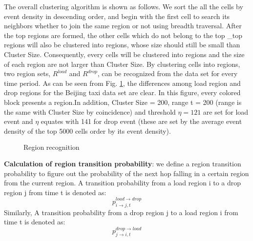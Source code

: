 The overall clustering algorithm is shown as follows. We sort the all the cells by event density in descending order, 
and begin with the first cell to search its neighbors whether to join the same region or not using breadth traversal. 
After the top regions are formed, the other cells which do not belong to the top \_top regions will also be clustered into regions, 
whose size should still be small than Cluster Size. Consequently, every cells will be clustered into regions and the size of each region are not larger than Cluster Size.
By clustering cells into regions, two region sets, \textbf{$R^{load}$} and \textbf{$R^{drop}$}, can be recognized from the data set for every time period. As can be seen from Fig. \ref{figure_region_recognizition}, the differences among load region and drop regions for the Beijing taxi data set are clear.
In this figure, every colored block presents a region.In addition, Cluster Size = 200, range t = 200 (range is the same with Cluster Size by coincidence) and threshold $\eta = 121$ are set for load event and $\eta$ equates with 141 for drop event (these are set by the average event density of the top 5000 cells order by its event density).
\begin{figure}[!t]
\centering
{}
\centering
\caption{Region recognition}\label{figure_region_recognizition}
\end{figure}

\textbf{Calculation of region transition probability}:
we define a region transition probability to figure out the probability of the next hop falling in a certain region from the current region.  A transition probability from a load region i to a drop region j from time t is denoted as:
\begin{equation}
p^{load\rightarrow drop}_{i\rightarrow j,t}
\end{equation}
Similarly, A transition probability from a drop region j to a load region i from time t is denoted as:
\begin{equation}
p^{drop\rightarrow load}_{j\rightarrow i,t}
\end{equation}


